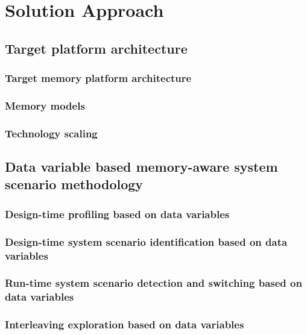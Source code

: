 \chapter{Solution Approach}
\label{method}

\section{Target platform architecture}

\subsection{Target memory platform architecture}

\subsection{Memory models}

\subsection{Technology scaling}

\section{Data variable based memory-aware system scenario methodology}

\subsection{Design-time profiling based on data variables}

\subsection{Design-time system scenario identification based on data variables}

\subsection{Run-time system scenario detection and switching based on data variables}

\subsection{Interleaving exploration based on data variables}

